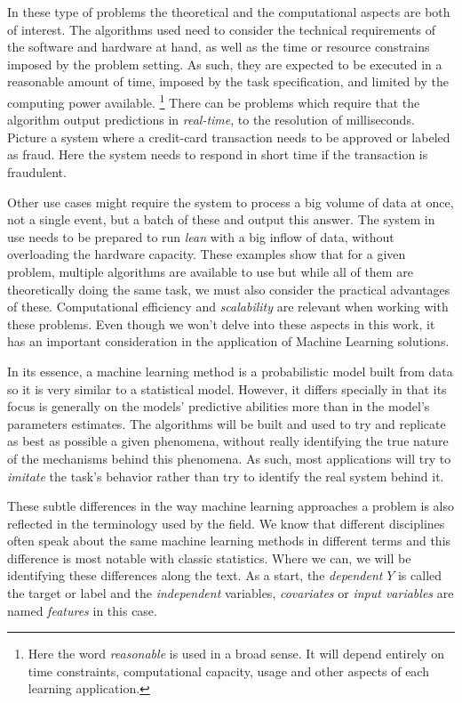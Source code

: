 In these type of problems the theoretical and the computational aspects are both of interest. The algorithms used need to consider the technical requirements of the software and hardware at hand, as well as the time or resource constrains imposed by the problem setting. As such, they are expected to be executed in a reasonable amount of time, imposed by the task specification, and limited by the computing power available. \footnote{Here the word \textit{reasonable} is used in a broad sense. It will depend entirely on time constraints, computational capacity, usage and other aspects of each learning application.} There can be  problems which require that the algorithm output predictions in \textit{real-time}, to the resolution of milliseconds. Picture a system where a credit-card transaction needs to be approved or labeled as fraud. Here the system needs to respond in short time if the transaction is fraudulent.

Other use cases might require the system to process a big volume of data at once, not a single event, but a batch of these and output this answer. The system in use needs to be prepared to run \textit{lean} with a big inflow of data, without overloading the hardware capacity.  These examples show that for a given problem, multiple algorithms are available to use but while all of them are theoretically doing the same task, we must also consider the practical advantages of these. Computational efficiency and \textit{scalability} are relevant when working with these problems. Even though we won't delve into these aspects in this work, it has an important consideration in the application of Machine Learning solutions.


In its essence, a machine learning method is a probabilistic model built from data so it is very similar to a statistical model. However, it differs specially in that its focus is generally on the models' predictive abilities more than in the model's parameters estimates.\textcite{breiman-statisticalmodeling} The algorithms will be built and used to try and replicate as best as possible a given phenomena, without really identifying the true nature of the mechanisms behind this phenomena. As such, most applications will try to \textit{imitate} the task's behavior rather than try to identify the real system behind it.


These subtle differences in the way machine learning approaches a problem is also reflected in the terminology used by the field. We know that different disciplines often speak about the same machine learning methods in different terms and this difference is most notable with classic statistics. Where we can, we will be identifying these differences along the text. As a start, the \textit{dependent} $Y$ is called the target or label and the \textit{independent} variables, \textit{covariates} or \textit{input variables} are named \textit{features} in this case.


